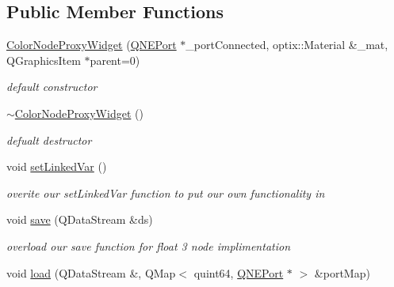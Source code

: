 \subsection*{Public Member Functions}
\begin{DoxyCompactItemize}
\item 
\hypertarget{class_color_node_proxy_widget_a7a3ed9e2294413a74f5f1470df0fd5c8}{\hyperlink{class_color_node_proxy_widget_a7a3ed9e2294413a74f5f1470df0fd5c8}{Color\-Node\-Proxy\-Widget} (\hyperlink{class_q_n_e_port}{Q\-N\-E\-Port} $\ast$\-\_\-port\-Connected, optix\-::\-Material \&\-\_\-mat, Q\-Graphics\-Item $\ast$parent=0)}\label{class_color_node_proxy_widget_a7a3ed9e2294413a74f5f1470df0fd5c8}

\begin{DoxyCompactList}\small\item\em default constructor \end{DoxyCompactList}\item 
\hypertarget{class_color_node_proxy_widget_a88d96309b54f772c61bbb9861587f444}{\hyperlink{class_color_node_proxy_widget_a88d96309b54f772c61bbb9861587f444}{$\sim$\-Color\-Node\-Proxy\-Widget} ()}\label{class_color_node_proxy_widget_a88d96309b54f772c61bbb9861587f444}

\begin{DoxyCompactList}\small\item\em defualt destructor \end{DoxyCompactList}\item 
\hypertarget{class_color_node_proxy_widget_aba24c0f8211c399c29c458a8ee0dd912}{void \hyperlink{class_color_node_proxy_widget_aba24c0f8211c399c29c458a8ee0dd912}{set\-Linked\-Var} ()}\label{class_color_node_proxy_widget_aba24c0f8211c399c29c458a8ee0dd912}

\begin{DoxyCompactList}\small\item\em overite our set\-Linked\-Var function to put our own functionality in \end{DoxyCompactList}\item 
\hypertarget{class_color_node_proxy_widget_a77c04ecaa265462cf7c06ffaab801c7e}{void \hyperlink{class_color_node_proxy_widget_a77c04ecaa265462cf7c06ffaab801c7e}{save} (Q\-Data\-Stream \&ds)}\label{class_color_node_proxy_widget_a77c04ecaa265462cf7c06ffaab801c7e}

\begin{DoxyCompactList}\small\item\em overload our save function for float 3 node implimentation \end{DoxyCompactList}\item 
\hypertarget{class_color_node_proxy_widget_acf3559d410469d180d064d9e352ccbcb}{void \hyperlink{class_color_node_proxy_widget_acf3559d410469d180d064d9e352ccbcb}{load} (Q\-Data\-Stream \&, Q\-Map$<$ quint64, \hyperlink{class_q_n_e_port}{Q\-N\-E\-Port} $\ast$ $>$ \&port\-Map)}\label{class_color_node_proxy_widget_acf3559d410469d180d064d9e352ccbcb}


\end{DoxyCompactItemize}
